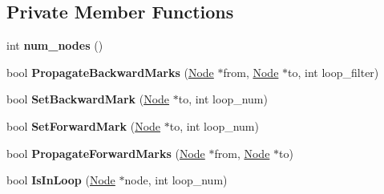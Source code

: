 \subsection*{Private Member Functions}
\begin{DoxyCompactItemize}
\item 
int {\bfseries num\+\_\+nodes} ()\hypertarget{classv8_1_1internal_1_1compiler_1_1_loop_finder_impl_aa038fa678fb4d5d1600504d307366146}{}\label{classv8_1_1internal_1_1compiler_1_1_loop_finder_impl_aa038fa678fb4d5d1600504d307366146}

\item 
bool {\bfseries Propagate\+Backward\+Marks} (\hyperlink{classv8_1_1internal_1_1compiler_1_1_node}{Node} $\ast$from, \hyperlink{classv8_1_1internal_1_1compiler_1_1_node}{Node} $\ast$to, int loop\+\_\+filter)\hypertarget{classv8_1_1internal_1_1compiler_1_1_loop_finder_impl_a659086772188819ce7b3bf8de6d5d8a0}{}\label{classv8_1_1internal_1_1compiler_1_1_loop_finder_impl_a659086772188819ce7b3bf8de6d5d8a0}

\item 
bool {\bfseries Set\+Backward\+Mark} (\hyperlink{classv8_1_1internal_1_1compiler_1_1_node}{Node} $\ast$to, int loop\+\_\+num)\hypertarget{classv8_1_1internal_1_1compiler_1_1_loop_finder_impl_ad3719757b2c36a91d1e1a008468e9119}{}\label{classv8_1_1internal_1_1compiler_1_1_loop_finder_impl_ad3719757b2c36a91d1e1a008468e9119}

\item 
bool {\bfseries Set\+Forward\+Mark} (\hyperlink{classv8_1_1internal_1_1compiler_1_1_node}{Node} $\ast$to, int loop\+\_\+num)\hypertarget{classv8_1_1internal_1_1compiler_1_1_loop_finder_impl_af28956cb6047d7024f373838a5e8d40f}{}\label{classv8_1_1internal_1_1compiler_1_1_loop_finder_impl_af28956cb6047d7024f373838a5e8d40f}

\item 
bool {\bfseries Propagate\+Forward\+Marks} (\hyperlink{classv8_1_1internal_1_1compiler_1_1_node}{Node} $\ast$from, \hyperlink{classv8_1_1internal_1_1compiler_1_1_node}{Node} $\ast$to)\hypertarget{classv8_1_1internal_1_1compiler_1_1_loop_finder_impl_a2277454b5f3c0d1faa6e56c73593c607}{}\label{classv8_1_1internal_1_1compiler_1_1_loop_finder_impl_a2277454b5f3c0d1faa6e56c73593c607}

\item 
bool {\bfseries Is\+In\+Loop} (\hyperlink{classv8_1_1internal_1_1compiler_1_1_node}{Node} $\ast$node, int loop\+\_\+num)\hypertarget{classv8_1_1internal_1_1compiler_1_1_loop_finder_impl_a42e466ecc5f6faf092778cf10ac9456b}{}\label{classv8_1_1internal_1_1compiler_1_1_loop_finder_impl_a42e466ecc5f6faf092778cf10ac9456b}


\end{DoxyCompactItemize}
